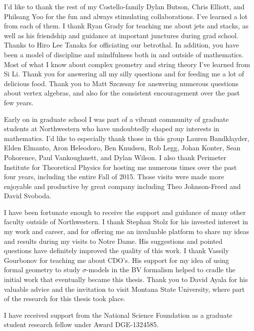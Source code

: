 I'd like to thank the rest of my Costello-family Dylan Butson, Chris Elliott, and Philsang Yoo for the fun and always stimulating collaborations. 
I've learned a lot from each of them. 
I thank Ryan Grady for teaching me about jets and stacks, as well as his friendship and guidance at important junctures during grad school. 
Thanks to Hiro Lee Tanaka for officiating our betrothal.
In addition, you have been a model of discipline and mindfulness both in and outside of mathematics.
Most of what I know about complex geometry and string theory I've learned from Si Li. 
Thank you for answering all my silly questions and for feeding me a lot of delicious food. 
Thank you to Matt Szczesny for answering numerous questions about vertex algebras, and also for the consistent encouragement over the past few years. 

Early on in graduate school I was part of a vibrant community of graduate students at Northwestern who have undoubtedly shaped my interests in mathematics.
I'd like to especially thank those in this group Lauren Bandklayder, Elden Elmanto, Aron Heleodoro, Ben Knudsen, Rob Legg, Johan Konter, Sean Pohorence, Paul Vankoughnett, and Dylan Wilson.
I also thank Perimeter Institute for Theoretical Physics for hosting me numerous times over the past four years, including the entire Fall of 2015. 
Those visits were made more enjoyable and productive by great company including Theo Johnson-Freed and David Svoboda. 

I have been fortunate enough to receive the support and guidance of many other faculty outside of Northwestern. 
I thank Stephan Stolz for his invested interest in my work and career, and for offering me an invaluable platform to share my ideas and results during my visits to Notre Dame. 
His suggestions and pointed questions have definitely improved the quality of this work. 
I thank Vassily Gourbonov for teaching me about CDO's.
His support for my idea of using formal geometry to study $\sigma$-models in the BV formalism helped to cradle the initial work that eventually became this thesis.
Thank you to David Ayala for his valuable advice and the invitation to visit Montana State University, where part of the research for this thesis took place.

I have received support from the National Science Foundation as a graduate student research fellow under Award DGE-1324585.
